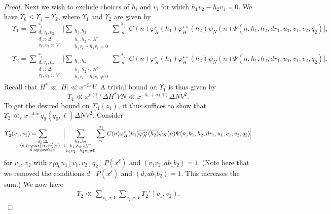 \documentclass{amsart}
\numberwithin{equation}{section}
\begin{document}
\begin{proof}
\vspace{3mm}
Next we wish to exclude choices of $h_i$ and $v_i$ for which $h_1v_2-h_2v_1=0$. We have $\Upsilon_0 \leq \Upsilon_1 + \Upsilon_2$, where   $\Upsilon_1$ and $\Upsilon_2$ are given by 
  \begin{align*}
&\Upsilon_1=\!\!\!\sum^{\,\,*_1}_{\substack{d, v_1, v_2 \\d \asymp \Delta \\ v_1, v_2 \asymp V 
}} \!\!\Big| \sum_{\substack{h_1, h_2 \\ h_1, h_2 \sim H^* \\ h_1 v_2 - h_2 v_1 = 0 }}  \sum_{\substack{n  }}^{\,\,*_2}\, C(n) \varphi_H^\star(h_1) \overline{\varphi_H^{\star\star}(h_2)}\psi_N(n) \Psi(n,h_1,h_2,dr_1,u_1,v_1,v_2,q_2) \Big|,\\
&\Upsilon_2=\!\!\!\sum^{\,\,*_1}_{\substack{d, v_1, v_2 \\d \asymp \Delta \\ v_1, v_2 \asymp V 
}} \!\!\Big| \sum_{\substack{h_1, h_2 \\ h_1, h_2 \sim H^* \\ h_1 v_2 - h_2 v_1 \neq 0 }}  \sum_{\substack{n  }}^{\,\,*_2}\, C(n) \varphi_H^\star(h_1) \overline{\varphi_H^{\star\star}(h_2)}\psi_N(n) \Psi(n,h_1,h_2,dr_1,u_1,v_1,v_2,q_2) \Big|.
\end{align*}
Recall that $H^* \ll |H| \ll x^{-5\varepsilon}V$. A trivial bound on  $\Upsilon_1$ is thus given by 
$$
\Upsilon_1  \ll x^{o(1)} \Delta H^*V N   \ll x^{-5\varepsilon+o(1)} \Delta NV^2  
.$$ To get the desired bound on $\Sigma_1(z_1)$, it thus suffices to show that $\Upsilon_2 \ll_{\varepsilon} x^{-4.5\varepsilon} q_0(q_0, \ell)\Delta NV^2 $. Consider 
\begin{align*}
\Upsilon_2'(v_1,v_2)=\!\!\!\!\!\!\!\!\!\!\!\!\!\!\!\!\!\!\sum_{\substack{d \asymp \Delta \\ (d,r_1q_0u_1[v_1,v_2]q_2)=1  \\  d \mbox{\begin{scriptsize}
squarefree
\end{scriptsize}}
}}\!\!\! \Big|\! \sum_{\substack{h_1, h_2 \\ h_1, h_2 \sim H^*  \\ h_1 v_2-h_2v_1 \neq 0}}  \sum_{\substack{n }}^{\,\,*_2} \, C(n)\varphi_H^\star(h_1) \overline{\varphi_H^{\star\star}(h_2)}\psi_N(n)  \Psi(n,h_1,h_2,dr_1,u_1,v_1,v_2,q_2) \Big|
\end{align*}
for  $v_1$, $v_2$ with $r_1 q_0u_1[v_1,v_2]q_2 \mid P(x^\delta)$ and $(v_1v_2,ab_1b_2)=1$. (Note here that we removed the conditions $d \mid P(x^\delta)$ and $(d,ab_1b_2)=1$. This increases the sum.) We now have
\begin{align*}
\Upsilon_2 \ll \sum_{v_1 \asymp V} \sum_{v_2 \asymp V} \Upsilon_2'(v_1,v_2).
\end{align*}


\end{proof}
\end{document}
